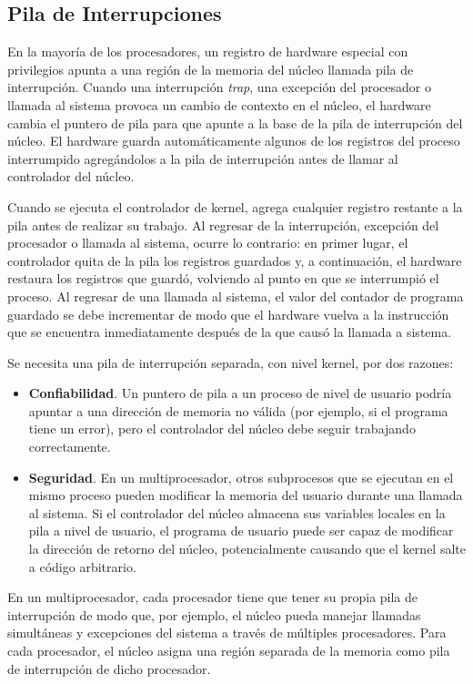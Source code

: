 \documentclass[10pt]{book}
\begin{document}
\subsection{Pila de Interrupciones}
En la mayoría de los procesadores, un registro de hardware especial con privilegios apunta a una región de la memoria del núcleo llamada pila de interrupción. Cuando una interrupción \textit{trap}, una excepción del procesador o llamada al sistema provoca un cambio de contexto en el núcleo, el hardware cambia el puntero de pila para que apunte a la base de la pila de interrupción del núcleo. El hardware guarda automáticamente algunos de los registros del proceso interrumpido agregándolos a la pila de interrupción antes de llamar al controlador del núcleo.

Cuando se ejecuta el controlador de kernel, agrega cualquier registro restante a la pila antes de realizar su trabajo. Al regresar de la interrupción, excepción del procesador o llamada al sistema, ocurre lo contrario: en primer lugar, el controlador quita de la pila los registros guardados y, a continuación, el hardware restaura los registros que guardó, volviendo al punto en que se interrumpió el proceso. Al regresar de una llamada al sistema, el valor del contador de programa guardado se debe incrementar de modo que el hardware vuelva a la instrucción que se encuentra inmediatamente después de la que causó la llamada a sistema.

Se necesita una pila de interrupción separada, con nivel kernel, por dos razones:

\begin{itemize}
\item \textbf{Confiabilidad}. Un puntero de pila a un proceso de nivel de usuario podría apuntar a una dirección de memoria no válida (por ejemplo, si el programa tiene un error), pero el controlador del núcleo debe seguir trabajando correctamente.

\item \textbf{Seguridad}. En un multiprocesador, otros subprocesos que se ejecutan en el mismo proceso pueden modificar la memoria del usuario durante una llamada al sistema. Si el controlador del núcleo almacena sus variables locales en la pila a nivel de usuario, el programa de usuario puede ser capaz de modificar la dirección de retorno del núcleo, potencialmente causando que el kernel salte a código arbitrario.
\end{itemize}

En un multiprocesador, cada procesador tiene que tener su propia pila de interrupción de modo que, por ejemplo, el núcleo pueda manejar llamadas simultáneas y excepciones del sistema a través de múltiples procesadores. Para cada procesador, el núcleo asigna una región separada de la memoria como pila de interrupción de dicho procesador.
\end{document}
